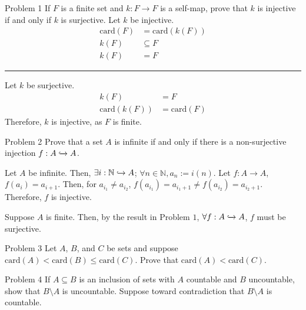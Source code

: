 \documentclass[10pt]{extarticle}
\title{}
\author{Avinash Iyer}
\date{}
\begin{document}
{
  \begin{problem}{Problem 1}
    If $F$ is a finite set and $k:F\rightarrow F$ is a self-map, prove that $k$ is injective if and only if $k$ is surjective.
    \tcblower
    Let $k$ be injective.
    \begin{align*}
      \textrm{card}(F) &= \textrm{card}(k(F))\tag*{definition of injection}\\
      k(F) &\subseteq F \tag*{definition of function}\\
      k(F) &= F
    \end{align*}
    \rule{\textwidth}{0.4pt}
    Let $k$ be surjective.
    \begin{align*}
      k(F) &= F \tag*{definition of surjection}\\
      \textrm{card}(k(F)) &= \textrm{card}(F) \tag*{cardinality definition}
    \end{align*}
    Therefore, $k$ is injective, as $F$ is finite.
  \end{problem}
  \begin{problem}{Problem 2}
    Prove that a set $A$ is infinite if and only if there is a non-surjective injection $f:A\xhookrightarrow{} A$.
    \tcblower
    \begin{description}[font=\normalfont]
      \item[$(\Rightarrow)$] Let $A$ be infinite. Then, $\exists i: \mathbb{N}\xhookrightarrow{} A$; $\forall n\in \mathbb{N}, a_n:=i(n)$. Let $f: A\rightarrow A$, $f(a_i) = a_{i+1}$. Then, for $a_{i_1} \neq a_{i_2}$, $f(a_{i_1}) = a_{i_1 + 1} \neq f(a_{i_2}) = a_{i_2 + 1}$. Therefore, $f$ is injective.
      \item[$(\Leftarrow)$] Suppose $A$ is finite. Then, by the result in Problem $1$, $\forall f: A\xhookrightarrow{} A$, $f$ must be surjective.
    \end{description}
  \end{problem}
  \begin{problem}{Problem 3}
    Let $A$, $B$, and $C$ be sets and suppose $\textrm{card}(A) < \textrm{card}(B) \leq \textrm{card}(C)$. Prove that $\textrm{card}(A) < \textrm{card}(C)$.
  \end{problem}
  \begin{problem}{Problem 4}
    If $A\subseteq B$ is an inclusion of sets with $A$ countable and $B$ uncountable, show that $B\setminus A$ is uncountable.
    \tcblower
    Suppose toward contradiction that $B\setminus A$ is countable.\\


\end{problem}}
\end{document}
